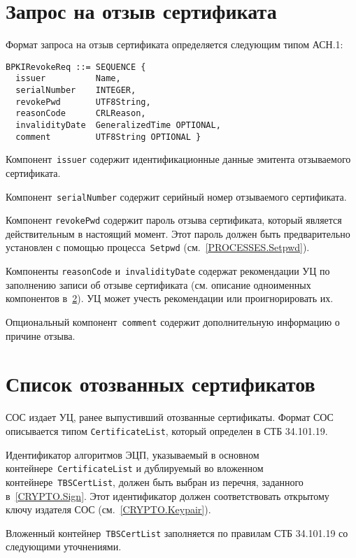 \section{Запрос на отзыв сертификата}\label{FMT.BPKIRevokeReq}

Формат запроса на отзыв сертификата определяется следующим типом АСН.1:
\begin{verbatim}
BPKIRevokeReq ::= SEQUENCE {
  issuer          Name,
  serialNumber    INTEGER,
  revokePwd       UTF8String,
  reasonCode      CRLReason,      
  invalidityDate  GeneralizedTime OPTIONAL,
  comment         UTF8String OPTIONAL }
\end{verbatim}

Компонент~\texttt{issuer} содержит идентификационные данные эмитента 
отзываемого сертификата.

Компонент~\texttt{serialNumber} содержит серийный номер отзываемого 
сертификата.

Компонент \texttt{revokePwd} содержит пароль отзыва
сертификата, который является действительным в 
настоящий момент. Этот пароль должен быть предварительно
установлен с помощью процесса~\texttt{Setpwd} (см.~\ref{PROCESSES.Setpwd}). 

Компоненты \texttt{reasonCode} и~\texttt{invalidityDate}
содержат рекомендации УЦ по заполнению записи об отзыве сертификата
(см. описание одноименных компонентов в~\ref{FMT.CRL}).
УЦ может учесть рекомендации или проигнорировать их.

Опциональный компонент~\texttt{comment} содержит дополнительную информацию 
о причине отзыва.
 
\section{Список отозванных сертификатов}\label{FMT.CRL}

СОС издает УЦ, ранее выпустивший отозванные сертификаты.
Формат СОС описывается типом \texttt{CertificateList}, который определен в 
СТБ 34.101.19. 

Идентификатор алгоритмов ЭЦП, указываемый в основном 
контейнере~\texttt{CertificateList} и дублируемый во вложенном  
контейнере~\texttt{TBSCertList}, должен быть выбран из перечня,  
заданного в~\ref{CRYPTO.Sign}. Этот идентификатор должен соответствовать 
открытому ключу издателя СОС (см.~\ref{CRYPTO.Keypair}).

Вложенный контейнер~\texttt{TBSCertList} заполняется по правилам СТБ 
34.101.19 со следующими уточнениями.

